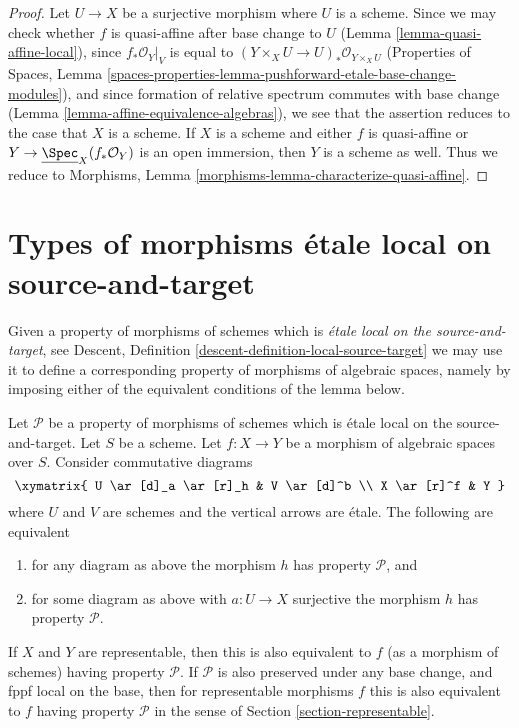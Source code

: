 \begin{proof}
Let $U \to X$ be a surjective morphism where $U$ is a scheme.
Since we may check whether $f$ is quasi-affine after base change to
$U$ (Lemma \ref{lemma-quasi-affine-local}), since $f_*\mathcal{O}_Y|_V$
is equal to $(Y \times_X U \to U)_*\mathcal{O}_{Y \times_X U}$
(Properties of Spaces, Lemma
\ref{spaces-properties-lemma-pushforward-etale-base-change-modules}), and
since formation of relative spectrum commutes with base change
(Lemma \ref{lemma-affine-equivalence-algebras}),
we see that the assertion reduces to the case that $X$ is a scheme.
If $X$ is a scheme and either $f$ is quasi-affine or
$Y \to \underline{\Spec}_X(f_*\mathcal{O}_Y)$ is an open immersion,
then $Y$ is a scheme as well. Thus we reduce to
Morphisms, Lemma \ref{morphisms-lemma-characterize-quasi-affine}.
\end{proof}







\section{Types of morphisms \'etale local on source-and-target}
\label{section-local-source-target}

\noindent
Given a property of morphisms of schemes which is {\it \'etale local on the
source-and-target}, see
Descent, Definition \ref{descent-definition-local-source-target}
we may use it to define a corresponding
property of morphisms of algebraic spaces, namely by imposing either of
the equivalent conditions of the lemma below.

\begin{lemma}
\label{lemma-local-source-target}
Let $\mathcal{P}$ be a property of morphisms of schemes
which is \'etale local on the source-and-target.
Let $S$ be a scheme.
Let $f : X \to Y$ be a morphism of algebraic spaces over $S$.
Consider commutative diagrams
$$
\xymatrix{
U \ar[d]_a \ar[r]_h & V \ar[d]^b \\
X \ar[r]^f & Y
}
$$
where $U$ and $V$ are schemes and the vertical arrows are \'etale.
The following are equivalent
\begin{enumerate}
\item for any diagram as above the morphism $h$ has property
$\mathcal{P}$, and
\item for some diagram as above with $a : U \to X$ surjective
the morphism $h$ has property $\mathcal{P}$.
\end{enumerate}
If $X$ and $Y$ are representable, then this is also equivalent to
$f$ (as a morphism of schemes) having property $\mathcal{P}$.
If $\mathcal{P}$ is also preserved under any base change, and
fppf local on the base, then for representable morphisms $f$ this
is also equivalent to $f$ having property $\mathcal{P}$ in the sense
of Section \ref{section-representable}.
\end{lemma}

